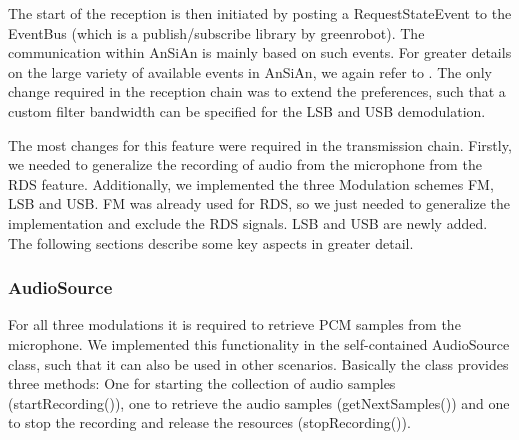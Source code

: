 The start of the reception is then initiated by posting a RequestStateEvent to the EventBus (which is a publish/subscribe library by greenrobot). The communication within AnSiAn is mainly based on such events. For greater details on the large variety of available events in AnSiAn, we again refer to \cite{Kreis2015}. The only change required in the reception chain was to extend the preferences, such that a custom filter bandwidth can be specified for the LSB and USB demodulation. 

The most changes for this feature were required in the transmission chain. Firstly, we needed to generalize the recording of audio from the microphone from the RDS feature. Additionally, we implemented the three Modulation schemes FM, LSB and USB. FM was already used for RDS, so we just needed to generalize the implementation and exclude the RDS signals. LSB and USB are newly added. The following sections describe some key aspects in greater detail. 

\subsubsection{AudioSource}

For all three modulations it is required to retrieve PCM samples from the microphone. We implemented this functionality in the self-contained AudioSource class, such that it can also be used in other scenarios. Basically the class provides three methods: One for starting the collection of audio samples (startRecording()), one to retrieve the audio samples (getNextSamples()) and one to stop the recording and release the resources (stopRecording()). 

